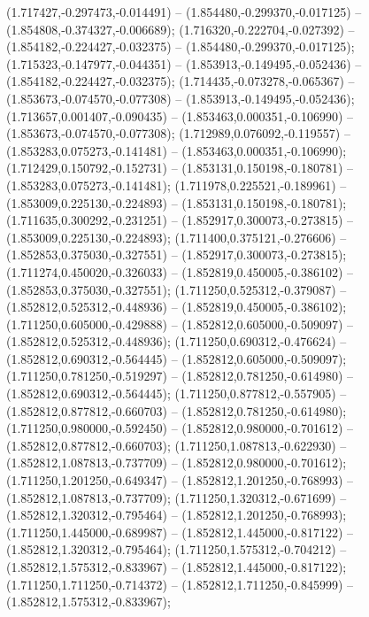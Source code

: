 (1.717427,-0.297473,-0.014491) -- (1.854480,-0.299370,-0.017125) -- (1.854808,-0.374327,-0.006689);
 (1.716320,-0.222704,-0.027392) -- (1.854182,-0.224427,-0.032375) -- (1.854480,-0.299370,-0.017125);
 (1.715323,-0.147977,-0.044351) -- (1.853913,-0.149495,-0.052436) -- (1.854182,-0.224427,-0.032375);
 (1.714435,-0.073278,-0.065367) -- (1.853673,-0.074570,-0.077308) -- (1.853913,-0.149495,-0.052436);
 (1.713657,0.001407,-0.090435) -- (1.853463,0.000351,-0.106990) -- (1.853673,-0.074570,-0.077308);
 (1.712989,0.076092,-0.119557) -- (1.853283,0.075273,-0.141481) -- (1.853463,0.000351,-0.106990);
 (1.712429,0.150792,-0.152731) -- (1.853131,0.150198,-0.180781) -- (1.853283,0.075273,-0.141481);
 (1.711978,0.225521,-0.189961) -- (1.853009,0.225130,-0.224893) -- (1.853131,0.150198,-0.180781);
 (1.711635,0.300292,-0.231251) -- (1.852917,0.300073,-0.273815) -- (1.853009,0.225130,-0.224893);
 (1.711400,0.375121,-0.276606) -- (1.852853,0.375030,-0.327551) -- (1.852917,0.300073,-0.273815);
 (1.711274,0.450020,-0.326033) -- (1.852819,0.450005,-0.386102) -- (1.852853,0.375030,-0.327551);
 (1.711250,0.525312,-0.379087) -- (1.852812,0.525312,-0.448936) -- (1.852819,0.450005,-0.386102);
 (1.711250,0.605000,-0.429888) -- (1.852812,0.605000,-0.509097) -- (1.852812,0.525312,-0.448936);
 (1.711250,0.690312,-0.476624) -- (1.852812,0.690312,-0.564445) -- (1.852812,0.605000,-0.509097);
 (1.711250,0.781250,-0.519297) -- (1.852812,0.781250,-0.614980) -- (1.852812,0.690312,-0.564445);
 (1.711250,0.877812,-0.557905) -- (1.852812,0.877812,-0.660703) -- (1.852812,0.781250,-0.614980);
 (1.711250,0.980000,-0.592450) -- (1.852812,0.980000,-0.701612) -- (1.852812,0.877812,-0.660703);
 (1.711250,1.087813,-0.622930) -- (1.852812,1.087813,-0.737709) -- (1.852812,0.980000,-0.701612);
 (1.711250,1.201250,-0.649347) -- (1.852812,1.201250,-0.768993) -- (1.852812,1.087813,-0.737709);
 (1.711250,1.320312,-0.671699) -- (1.852812,1.320312,-0.795464) -- (1.852812,1.201250,-0.768993);
 (1.711250,1.445000,-0.689987) -- (1.852812,1.445000,-0.817122) -- (1.852812,1.320312,-0.795464);
 (1.711250,1.575312,-0.704212) -- (1.852812,1.575312,-0.833967) -- (1.852812,1.445000,-0.817122);
 (1.711250,1.711250,-0.714372) -- (1.852812,1.711250,-0.845999) -- (1.852812,1.575312,-0.833967);
